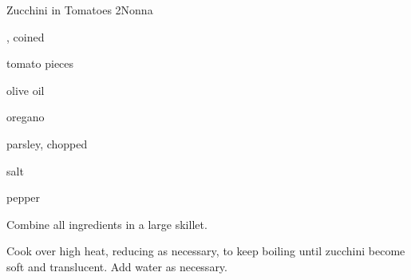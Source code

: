 \begin{recipe}{Zucchini in Tomatoes 2}{Nonna}{}

\begin{ingredients}
\item {}, coined
\item tomato pieces
\item olive oil
\item oregano
\item parsley, chopped
\item salt
\item pepper
\end{ingredients}

\begin{directions}
\item Combine all ingredients in a large skillet.
\item Cook over high heat, reducing as necessary, to keep boiling until zucchini become soft and translucent. Add water as necessary.
\end{directions}

\end{recipe}
